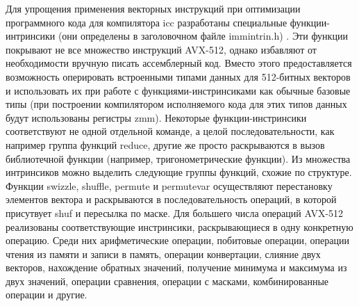 Для упрощения применения векторных инструкций при оптимизации программного кода для компилятора icc разработаны специальные функции-интринсики (они определены в заголовочном файле immintrin.h) \cite{IntelIntrinsicsGuide}.
Эти функции покрывают не все множество инструкций AVX-512, однако избавляют от необходимости вручную писать ассемблерный код.
Вместо этого предоставляется возможность оперировать встроенными типами данных для 512-битных векторов и использовать их при работе с функциями-инстринсиками как обычные базовые типы (при построении компилятором исполняемого кода для этих типов данных будут использованы регистры zmm).
Некоторые функции-инстринсики соответствуют не одной отдельной команде, а целой последовательности, как например группа функций reduce, другие же просто раскрываются в вызов библиотечной функции (например, тригонометрические функции).
Из множества интринсиков можно выделить следующие группы функций, схожие по структуре.
Функции swizzle, shuffle, permute и permutevar осуществляют перестановку элементов вектора и раскрываются в последовательность операций, в которой присутвует shuf и пересылка по маске.
Для большего числа операций AVX-512 реализованы соответствующие инстринсики, раскрывающиеся в одну конкретную операцию.
Среди них арифметические операции, побитовые операции, операции чтения из памяти и записи в память, операции конвертации, слияние двух векторов, нахождение обратных значений, получение минимума и максимума из двух значений, операции сравнения, операции с масками, комбинированные операции и другие.
